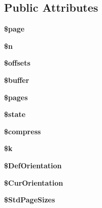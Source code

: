 \subsection*{Public Attributes}
\begin{DoxyCompactItemize}
\item 
\hypertarget{classFPDF_ab36ea1d04d26856c68ed3021b56eec5b}{}{\bfseries \$page}\label{classFPDF_ab36ea1d04d26856c68ed3021b56eec5b}

\item 
\hypertarget{classFPDF_a718a78c2c592d0a027429947df12d161}{}{\bfseries \$n}\label{classFPDF_a718a78c2c592d0a027429947df12d161}

\item 
\hypertarget{classFPDF_a15347dda89239d5fa79ead40a72e0e34}{}{\bfseries \$offsets}\label{classFPDF_a15347dda89239d5fa79ead40a72e0e34}

\item 
\hypertarget{classFPDF_aa5e639d922350949dc1a58a4597c58bb}{}{\bfseries \$buffer}\label{classFPDF_aa5e639d922350949dc1a58a4597c58bb}

\item 
\hypertarget{classFPDF_a43708e8b1a7d9c88f08982c4473d7767}{}{\bfseries \$pages}\label{classFPDF_a43708e8b1a7d9c88f08982c4473d7767}

\item 
\hypertarget{classFPDF_a8aef065fb2791fd919608521a801b7d3}{}{\bfseries \$state}\label{classFPDF_a8aef065fb2791fd919608521a801b7d3}

\item 
\hypertarget{classFPDF_a6effca6f281458983c61647878f6dc18}{}{\bfseries \$compress}\label{classFPDF_a6effca6f281458983c61647878f6dc18}

\item 
\hypertarget{classFPDF_adadc589358125e9865dc6565722b7a08}{}{\bfseries \$k}\label{classFPDF_adadc589358125e9865dc6565722b7a08}

\item 
\hypertarget{classFPDF_ad1640384fda9ee53cf7295eb823a31dc}{}{\bfseries \$\+Def\+Orientation}\label{classFPDF_ad1640384fda9ee53cf7295eb823a31dc}

\item 
\hypertarget{classFPDF_a40250e931a9dd32601bbe2a5a1eaf492}{}{\bfseries \$\+Cur\+Orientation}\label{classFPDF_a40250e931a9dd32601bbe2a5a1eaf492}

\item 
\hypertarget{classFPDF_a8cfbaabd6e5ec70a7d074323f2295a41}{}{\bfseries \$\+Std\+Page\+Sizes}\label{classFPDF_a8cfbaabd6e5ec70a7d074323f2295a41}


\end{DoxyCompactItemize}
